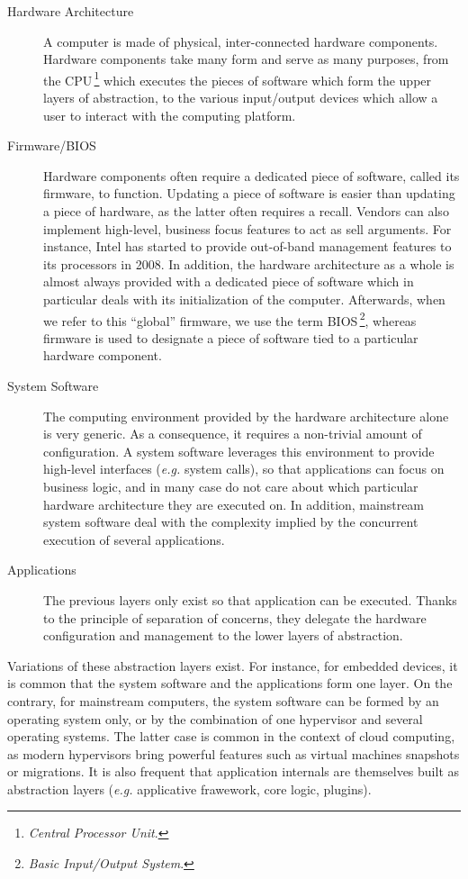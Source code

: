 \begin{description}
\item [Hardware Architecture]
  A computer is made of physical, inter-connected hardware components.
  Hardware components take many form and serve as many purposes, from the
  CPU\,\footnote{\emph{Central Processor Unit}.} which executes the pieces of
  software which form the upper layers of abstraction, to the various
  input/output devices which allow a user to interact with the computing
  platform.
\item [Firmware/BIOS]
  Hardware components often require a dedicated piece of software, called its
  firmware, to function.
  Updating a piece of software is easier than updating a piece of hardware, as
  the latter often requires a recall.
  Vendors can also implement high-level, business focus features to act as sell
  arguments.
  For instance, Intel has started to provide out-of-band management features to
  its processors in 2008.
  In addition, the hardware architecture as a whole is almost always provided
  with a dedicated piece of software which in particular deals with its
  initialization of the computer.
  Afterwards, when we refer to this ``global'' firmware, we use the term
  BIOS\,\footnote{\emph{Basic Input/Output System}.}, whereas firmware is used
  to designate a piece of software tied to a particular hardware component.
\item [System Software]
  The computing environment provided by the hardware architecture alone is very
  generic.
  As a consequence, it requires a non-trivial amount of configuration.
  A system software leverages this environment to provide high-level interfaces
  (\emph{e.g.} system calls), so that applications can focus on business logic,
  and in many case do not care about which particular hardware architecture they
  are executed on.
  In addition, mainstream system software deal with the complexity implied by
  the concurrent execution of several applications.
\item [Applications]
  The previous layers only exist so that application can be executed.
  Thanks to the principle of separation of concerns, they delegate the hardware
  configuration and management to the lower layers of abstraction.
\end{description}

Variations of these abstraction layers exist.
%
For instance, for embedded devices, it is common that the system software and
the applications form one layer.
%
On the contrary, for mainstream computers, the system software can be formed by
an operating system only, or by the combination of one hypervisor and several
operating systems.
%
The latter case is common in the context of cloud computing, as modern
hypervisors bring powerful features such as virtual machines snapshots or
migrations.
%
It is also frequent that application internals are themselves built as
abstraction layers (\emph{e.g.} applicative frawework, core logic, plugins).

